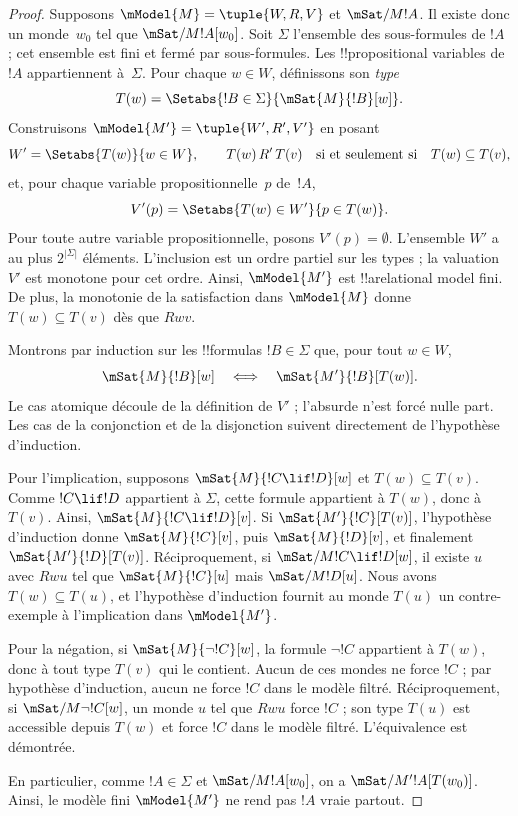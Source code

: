 \documentclass[../../../include/open-logic-section]{subfiles}
\begin{document}
\begin{proof}
  Supposons $\mModel{M}=\tuple{W,R,V}$ et
  $\mSat/{M}{!A}$. Il existe donc un monde~$w_0$ tel que
  $\mSat/{M}{!A}[w_0]$. Soit $\Sigma$ l'ensemble des sous-formules de
  $!A$ ; cet ensemble est fini et fermé par sous-formules. Les
  !!{propositional variable}s de~$!A$ appartiennent à~$\Sigma$. Pour
  chaque $w \in W$, définissons son \emph{type}
  \[
    T(w)=\Setabs{!B \in \Sigma}{\mSat{M}{!B}[w]}.
  \]
  Construisons $\mModel{M'}=\tuple{W',R',V'}$ en posant
  \[
    W'=\Setabs{T(w)}{w\in W},\qquad
    T(w)\,R'\,T(v)\quad\text{si et seulement si}\quad
    T(w)\subseteq T(v),
  \]
  et, pour chaque variable propositionnelle~$p$ de~$!A$,
  \[
    V'(p)=\Setabs{T(w)\in W'}{p\in T(w)}.
  \]
  Pour toute autre variable propositionnelle, posons $V'(p)=\emptyset$.
  L'ensemble $W'$ a au plus $2^{|\Sigma|}$ éléments. L'inclusion
  est un ordre partiel sur les types ; la valuation $V'$ est monotone
  pour cet ordre. Ainsi, $\mModel{M'}$ est !!a{relational model} fini.
  De plus, la monotonie de la satisfaction dans
  $\mModel{M}$ donne $T(w)\subseteq T(v)$ dès que $Rwv$.

  Montrons par induction sur les !!{formula}s $!B\in\Sigma$ que,
  pour tout $w\in W$,
  \[
    \mSat{M}{!B}[w]\quad\Longleftrightarrow\quad
    \mSat{M'}{!B}[T(w)].
  \]
  Le cas atomique découle de la définition de $V'$ ; l'absurde
  n'est forcé nulle part. Les cas de la conjonction et de la
  disjonction suivent directement de l'hypothèse d'induction.

  Pour l'implication, supposons
  $\mSat{M}{!C\lif !D}[w]$ et $T(w)\subseteq T(v)$. Comme
  $!C\lif !D$ appartient à $\Sigma$, cette formule appartient à
  $T(w)$, donc à $T(v)$. Ainsi,
  $\mSat{M}{!C\lif !D}[v]$. Si
  $\mSat{M'}{!C}[T(v)]$, l'hypothèse d'induction donne
  $\mSat{M}{!C}[v]$, puis $\mSat{M}{!D}[v]$, et finalement
  $\mSat{M'}{!D}[T(v)]$. Réciproquement, si
  $\mSat/{M}{!C\lif !D}[w]$, il existe $u$ avec $Rwu$ tel que
  $\mSat{M}{!C}[u]$ mais $\mSat/{M}{!D}[u]$. Nous avons
  $T(w)\subseteq T(u)$, et l'hypothèse d'induction fournit au monde
  $T(u)$ un contre-exemple à l'implication dans $\mModel{M'}$.

  Pour la négation, si $\mSat{M}{\lnot !C}[w]$, la formule
  $\lnot !C$ appartient à $T(w)$, donc à tout type $T(v)$ qui le
  contient. Aucun de ces mondes ne force $!C$ ; par hypothèse
  d'induction, aucun ne force $!C$ dans le modèle filtré.
  Réciproquement, si $\mSat/{M}{\lnot !C}[w]$, un monde $u$ tel que
  $Rwu$ force $!C$ ; son type $T(u)$ est accessible depuis $T(w)$ et
  force $!C$ dans le modèle filtré. L'équivalence est démontrée.

  En particulier, comme $!A\in\Sigma$ et
  $\mSat/{M}{!A}[w_0]$, on a
  $\mSat/{M'}{!A}[T(w_0)]$. Ainsi, le modèle fini
  $\mModel{M'}$ ne rend pas $!A$ vraie partout.
\end{proof}
\end{document}
